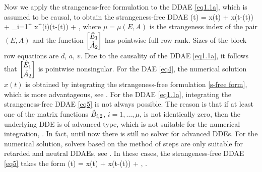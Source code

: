 \documentclass[final,reqno]{siamltex}
\begin{document}
Now we apply the strangeness-free formulation to the DDAE \eqref{eq1.1a}, which is assumed to be causal, to obtain the strangeness-free DDAE
%
\be\label{eq5}
  (t) \!=\!  x(t) \!+\!
  x(t-\vtau(t))
 \!+\!  \sum_{i=1}^{\mu}  x^{(i)}(t-\vtau(t))
 \!+\! , \quad {}
\ee
%
where $\mu=\mu(E,A)$ is the strangeness index of the pair $(E,A)$ and the function $\begin{bmatrix} \hat{E}_1 \\ \hat{A}_2 \end{bmatrix}$ has pointwise full row rank.
Sizes of the block row equations are $d$, $a$, $v$. Due to the causality of the DDAE \eqref{eq1.1a}, it follows that $\begin{bmatrix} \hat{E}_1 \\ \hat{A}_2 \end{bmatrix}$ is pointwise 
nonsingular.
For the DAE \eqref{eq4}, the numerical solution $x(t)$ is obtained by integrating the strangeness-free formulation \eqref{s-free form}, which is more 
advantageous, see \cite{KunM96a,KunM96c,KunM06}.
For the DDAE \eqref{eq1.1a}, integrating the strangeness-free DDAE \eqref{eq5} is not always possible. The reason is that if 
at least one of the matrix functions $\hat{B}_{i,2}$, $i=1,\dots,\mu$, is not identically zero, then the underlying DDE 
is of advanced type, which is not suitable for the numerical integration, \cite{BelZ03}. In fact, until now there is still no solver for advanced DDEs. 
For the numerical solution, solvers based on the method of steps are only suitable for retarded and neutral DDAEs, see \cite{AscP95,GugH07,Hau97,HaM14}.
In these cases, the strangeness-free DDAE \eqref{eq5} takes the form
%
\be\label{eq6}
  (t) \!=\!  x(t) \!+\!
  x(t-\vtau(t)) \!+\! , \quad {}.
\end{document}
